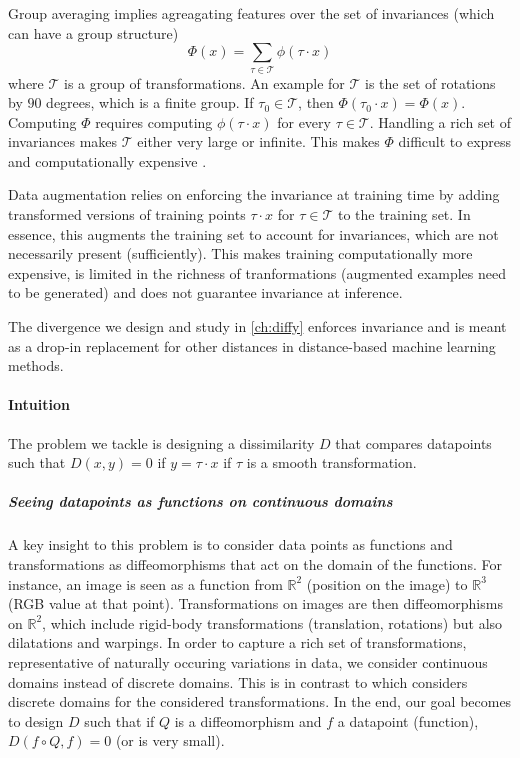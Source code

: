 Group averaging implies agreagating features over the set of invariances (which can have a group structure)
\begin{equation}
    \Phi(x) = \sum_{\tau \in \mathcal T} \phi(\tau \cdot x)
\end{equation}
where $\mathcal T$ is a group of transformations. An example for $\mathcal T$ is the set of rotations by $90$ degrees, which is a finite group. If $\tau_0\in\mathcal T$, then $\Phi(\tau_0 \cdot x) = \Phi(x)$. Computing $\Phi$ requires computing $\phi(\tau \cdot x)$ for every $\tau\in\mathcal T$. Handling a rich set of invariances makes $\mathcal T$ either very large or infinite. This makes $\Phi$ difficult to express and computationally expensive \cite{bietti}.

Data augmentation relies on enforcing the invariance at training time by adding transformed versions of training points $\tau \cdot x$ for $\tau \in \mathcal T$ to the training set. In essence, this augments the training set to account for invariances, which are not necessarily present (sufficiently). This makes training computationally more expensive, is limited in the richness of tranformations (augmented examples need to be generated) and does not guarantee invariance at inference.

The divergence we design and study in \cref{ch:diffy} enforces invariance and is meant as a drop-in replacement for other distances in distance-based machine learning methods.

\paragraph{Intuition}

The problem we tackle is designing a dissimilarity $D$ that compares datapoints such that $D(x, y) = 0$ if $y = \tau \cdot x$ if $\tau$ is a smooth transformation.

\subparagraph{Seeing datapoints as functions on continuous domains} A key insight to this problem is to consider data points as functions and transformations as diffeomorphisms that act on the domain of the functions. For instance, an image is seen as a function from $\mathbb R^2$ (position on the image) to $\mathbb R^3$ (RGB value at that point). Transformations on images are then diffeomorphisms on $\mathbb R^2$, which include rigid-body transformations (translation, rotations) but also dilatations and warpings.
In order to capture a rich set of transformations, representative of naturally occuring variations in data, we consider continuous domains instead of discrete domains. This is in contrast to \cite{bietti} which considers discrete domains for the considered transformations.
In the end, our goal becomes to design $D$ such that if $Q$ is a diffeomorphism and $f$ a datapoint (function), $D(f\circ Q, f) = 0$ (or is very small).

